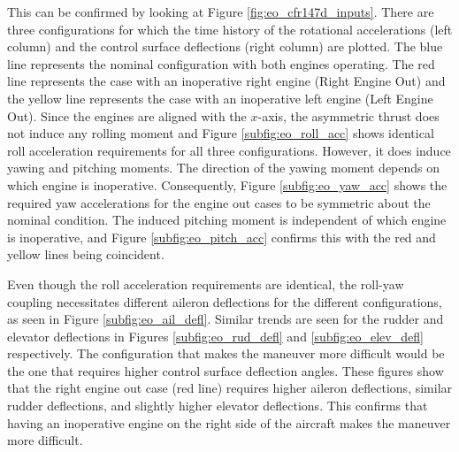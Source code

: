 This can be confirmed by looking at Figure \ref{fig:eo_cfr147d_inputs}. 
There are three configurations for which the time history of the rotational accelerations (left column) and the control surface deflections (right column) are plotted.
The blue line represents the nominal configuration with both engines operating. 
The red line represents the case with an inoperative right engine (Right Engine Out) and the yellow line represents the case with an inoperative left engine (Left Engine Out).
Since the engines are aligned with the $x$-axis, the asymmetric thrust does not induce any rolling moment and Figure \ref{subfig:eo_roll_acc} shows identical roll acceleration requirements for all three configurations.
However, it does induce yawing and pitching moments. 
The direction of the yawing moment depends on which engine is inoperative.
Consequently, Figure \ref{subfig:eo_yaw_acc} shows the required yaw accelerations for the engine out cases to be symmetric about the nominal condition. 
The induced pitching moment is independent of which engine is inoperative, and Figure \ref{subfig:eo_pitch_acc} confirms this with the red and yellow lines being coincident. 

Even though the roll acceleration requirements are identical, the roll-yaw coupling necessitates different aileron deflections for the different configurations, as seen in Figure \ref{subfig:eo_ail_defl}. 
Similar trends are seen for the rudder and elevator deflections in Figures \ref{subfig:eo_rud_defl} and \ref{subfig:eo_elev_defl} respectively. 
The configuration that makes the maneuver more difficult would be the one that requires higher control surface deflection angles. 
These figures show that the right engine out case (red line) requires higher aileron deflections, similar rudder deflections, and slightly higher elevator deflections. 
This confirms that having an inoperative engine on the right side of the aircraft makes the maneuver more difficult.

